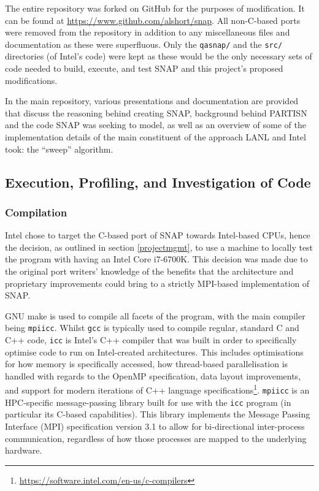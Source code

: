 \documentclass[conference]{IEEEtran}
\begin{document}
The entire repository was forked on GitHub for the purposes of modification. It can be found at \url{https://www.github.com/alshort/snap}. All non-C-based ports were removed from the repository in addition to any miscellaneous files and documentation as these were superfluous. Only the \texttt{qasnap/} and the \texttt{src/} directories (of Intel's code) were kept as these would be the only necessary sets of code needed to build, execute, and test SNAP and this project's proposed modifications.

In the main repository, various presentations and documentation are provided that discuss the reasoning behind creating SNAP, background behind PARTISN and the code SNAP was seeking to model, as well as an overview of some of the implementation details of the main constituent of the approach LANL and Intel took: the ``sweep'' algorithm.

\subsection{Execution, Profiling, and Investigation of Code}

\subsubsection{Compilation}

Intel chose to target the C-based port of SNAP towards Intel-based CPUs, hence the decision, as outlined in section \ref{projectmgmt}, to use a machine to locally test the program with having an Intel Core i7-6700K. This decision was made due to the original port writers' knowledge of the benefits that the architecture and proprietary improvements could bring to a strictly MPI-based implementation of SNAP.

GNU make is used to compile all facets of the program, with the main compiler being \texttt{mpiicc}. Whilst \texttt{gcc} is typically used to compile regular, standard C and C++ code, \texttt{icc} is Intel's C++ compiler that was built in order to specifically optimise code to run on Intel-created architectures. This includes optimisations for how memory is specifically accessed, how thread-based parallelisation is handled with regards to the OpenMP specification, data layout improvements, and support for modern iterations of C++ language specifications\footnote{\url{https://software.intel.com/en-us/c-compilers}}. \texttt{mpiicc} is an HPC-specific message-passing library built for use with the \texttt{icc} program (in particular its C-based capabilities). This library implements the Message Passing Interface (MPI) specification version 3.1\cite{intel-mpi-ref} to allow for bi-directional inter-process communication, regardless of how those processes are mapped to the underlying hardware.
\end{document}
